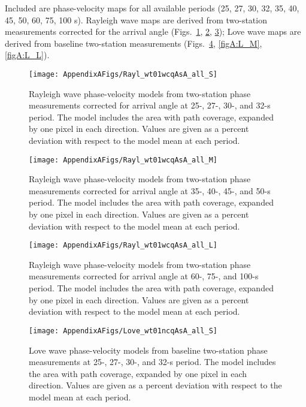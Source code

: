 \documentclass[12pt,oneside]{book}
\begin{document}
Included are phase-velocity maps for all available periods (25, 27, 30, 32, 35, 40, 45, 50, 60, 75, 100 s). Rayleigh wave maps are derived from two-station measurements corrected for the arrival angle (Figs.~\ref{figA:R_S}, \ref{figA:R_M}, \ref{figA:R_L}); Love wave maps are derived from baseline two-station measurements (Figs.~\ref{figA:L_S}, \ref{figA:L_M}, \ref{figA:L_L}). 

\begin{figure} 
\begin{center}
\texttt{[image: AppendixAFigs/Rayl\_wt01wcqAsA\_all\_S]} 
\caption[Rayleigh wave phase-velocity maps: 25-, 27-, 30-, and 32-s]{Rayleigh wave phase-velocity models from two-station phase measurements corrected for arrival angle at 25-, 27-, 30-, and 32-s period. The model includes the area with path coverage, expanded by one pixel in each direction. Values are given as a percent deviation with respect to the model mean at each period.}
\label{figA:R_S}
\end{center}
\end{figure}
%
\begin{figure} 
\begin{center}
\texttt{[image: AppendixAFigs/Rayl\_wt01wcqAsA\_all\_M]} 
\caption[Rayleigh wave phase-velocity maps: 35-, 40-, 45-, and 50-s]{Rayleigh wave phase-velocity models from two-station phase measurements corrected for arrival angle at 35-, 40-, 45-, and 50-s period. The model includes the area with path coverage, expanded by one pixel in each direction. Values are given as a percent deviation with respect to the model mean at each period.}
\label{figA:R_M}
\end{center}
\end{figure}
%
\begin{figure} 
\begin{center}
\texttt{[image: AppendixAFigs/Rayl\_wt01wcqAsA\_all\_L]} 
\caption[Rayleigh wave phase-velocity maps: 60-, 75-, and 100-s]{Rayleigh wave phase-velocity models from two-station phase measurements corrected for arrival angle at 60-, 75-, and 100-s period. The model includes the area with path coverage, expanded by one pixel in each direction. Values are given as a percent deviation with respect to the model mean at each period.}
\label{figA:R_L}
\end{center}
\end{figure}
%
\begin{figure} 
\begin{center}
\texttt{[image: AppendixAFigs/Love\_wt01ncqAsA\_all\_S]} 
\caption[Love wave phase-velocity maps: 25-, 27-, 30-, and 32-s]{Love wave phase-velocity models from baseline two-station phase measurements at 25-, 27-, 30-, and 32-s period. The model includes the area with path coverage, expanded by one pixel in each direction. Values are given as a percent deviation with respect to the model mean at each period.}
\label{figA:L_S}
\end{center}
\end{figure}
\end{document}
